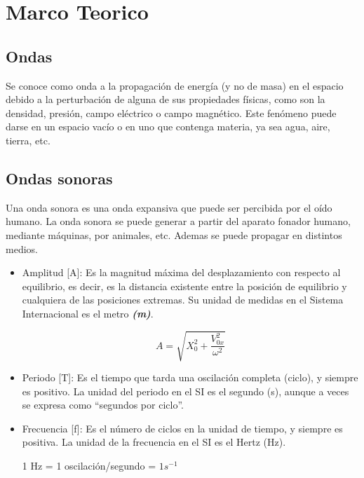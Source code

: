 \documentclass[letterpaper, 12pt]{article}
\newcommand{\bolditalic}[1]{\textbf{\textit{#1}}}
\begin{document}
\section*{Marco Teorico}

\subsection*{Ondas~\cite{onda_concepto}}

Se conoce como onda a la propagación de energía (y no de
masa) en el espacio debido a la perturbación de alguna de
sus propiedades físicas, como son la densidad, presión,
campo eléctrico o campo magnético. Este fenómeno puede
darse en un espacio vacío o en uno que contenga materia, ya
sea agua, aire, tierra, etc.

\subsection*{Ondas sonoras~\cite{ondas_sonoras}}

Una onda sonora es una onda expansiva que puede ser
percibida por el oído humano. La onda sonora se puede
generar a partir del aparato fonador humano, mediante
máquinas, por animales, etc. Ademas se puede propagar en
distintos medios.

\begin{itemize}[label=$\triangleright$]
	\item Amplitud [A]: Es la magnitud máxima del desplazamiento con
	      respecto al equilibrio, es decir, es la distancia existente
	      entre la posición de equilibrio y cualquiera de las
	      posiciones extremas. Su unidad de medidas en el Sistema
	      Internacional es el metro \bolditalic{(m)}.

	      \begin{equation*}
		      A = \sqrt{X_{0}^{2} + \frac{V_{0x}^{2}}{\omega^{2}}}
	      \end{equation*}

	\item Periodo [T]: Es el tiempo que tarda una oscilación completa
	      (ciclo), y siempre es positivo. La unidad del periodo en el
	      SI es el segundo \bolditalic{}{(s)}, aunque a veces se
	      expresa como “segundos por ciclo”.

	\item Frecuencia [f]: Es el número de ciclos en la unidad de
	      tiempo, y siempre es positiva. La unidad de la frecuencia
	      en el SI es el Hertz (Hz).

	      1 Hz = 1 oscilación/segundo = $1s^{-1}$

\end{itemize}
\end{document}

